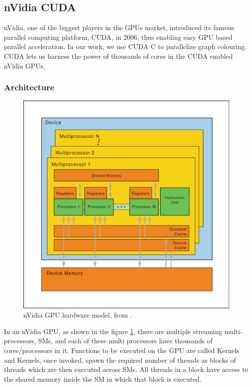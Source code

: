 \documentclass[MTech]{iitmdiss}
\begin{document}
\subsection{nVidia CUDA}
nVidia, one of the biggest players in the GPUs market, introduced its famous parallel computing platform, CUDA, in 2006, thus enabling easy GPU based parallel acceleration. In our work, we use CUDA C to parallelize graph colouring. CUDA lets us harness the power of thousands of cores in the CUDA enabled nVidia GPUs.
\subsubsection{Architecture}
\begin{figure}[h]
    \centering
    \includegraphics[width=\textwidth,scale=0.4,keepaspectratio=true]{hardware-model.png}
    \caption{
        nVidia GPU hardware model, from \cite{nVidia:Hardware}.
    }
    \label{fig:nvidia}
\end{figure}
In an nVidia GPU, as shown in the figure \ref{fig:nvidia}, there are multiple streaming multi-processors, SMs, and each of these multi processors have thousands of cores/processors in it. Functions to be executed on the GPU are called Kernels and Kernels, once invoked, spawn the required number of threads as blocks of threads which are then executed across SMs. All threads in a block have access to the shared memory inside the SM in which that block is executed.
\end{document}
